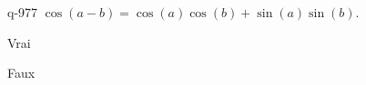 \begin{truefalse}{q-977}
$\cos(a-b)=\cos(a)\cos(b)+\sin(a)\sin(b)$.
\item* Vrai
\item Faux
\end{truefalse}


